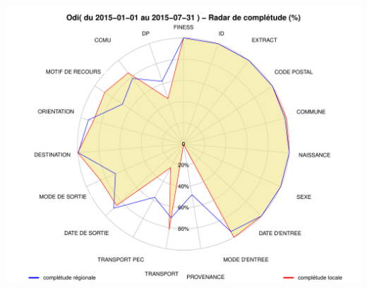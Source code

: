 \documentclass[]{article}
\begin{document}
\includegraphics{completude_files/figure-latex/finess-14.pdf}
\end{document}
